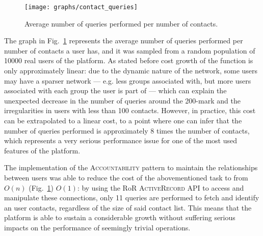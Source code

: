 \begin{figure}[H]
  \centering
  \texttt{[image: graphs/contact\_queries]}
  \caption{Average number of queries performed per number of contacts.}
  \label{fig:contact_queries}
\end{figure}

The graph in Fig.~\ref{fig:contact_queries} represents the average number of queries performed per number of contacts a user has, and it was sampled from a random population of 10000 real users of the platform. As stated before cost growth of the function is only approximately linear: due to the dynamic nature of the network, some users may have a sparser network --- e.g. less groups associated with, but more users associated with each group the user is part of --- which can explain the unexpected decrease in the number of queries around the 200-mark and the irregularities in users with less than 100 contacts. However, in practice, this cost can be extrapolated to a linear cost, to a point where one can infer that the number of queries performed is approximately 8 times the number of contacts, which represents a very serious performance issue for one of the most used features of the platform.


The implementation of the \textsc{Accountability} pattern to maintain the relationships between users was able to reduce the cost of the abovementioned task to from $O(n)$ (Fig.~\ref{fig:contact_queries}) $O(1)$: by using the RoR \textsc{ActiveRecord} API to access and manipulate these connections, only 11 queries are performed to fetch and identify an user contacts, regardless of the size of said contact list. This means that the platform is able to sustain a considerable growth without suffering serious impacts on the performance of seemingly trivial operations.

